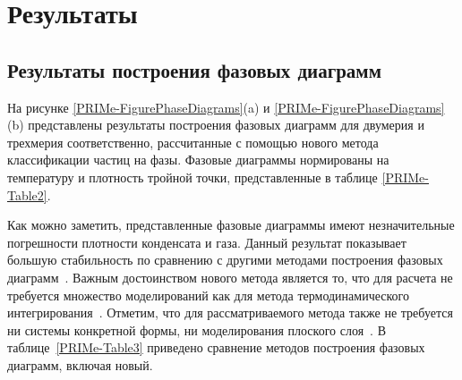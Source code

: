 \section{Результаты}
\label{PRIMe-SecResults}

\subsection{Результаты построения фазовых диаграмм}
\label{PRIMe-SubSecPhaseDiagramResults}

На рисунке \ref{PRIMe-FigurePhaseDiagrams}(a) и \ref{PRIMe-FigurePhaseDiagrams}(b) представлены результаты построения фазовых диаграмм для двумерия и трехмерия соответственно, рассчитанные с помощью нового метода классификации частиц на фазы.
Фазовые диаграммы нормированы на температуру и плотность тройной точки, представленные в таблице \ref{PRIMe-Table2}.

Как можно заметить, представленные фазовые диаграммы имеют незначительные погрешности плотности конденсата и газа.
Данный результат показывает большую стабильность по сравнению с другими методами построения фазовых диаграмм~\cite{10.1021/jp806127j, 10.1021/jp1117213}.
Важным достоинством нового метода является то, что для расчета не требуется множество моделирований как для метода термодинамического интегрирования~\cite{10.1080/00268976.2019.1699185}. Отметим, что для рассматриваемого метода также не требуется ни системы конкретной формы, ни моделирования плоского слоя~\cite{10.1021/jp806127j, 10.1021/jp1117213}.
В таблице~\ref{PRIMe-Table3} приведено сравнение методов построения фазовых диаграмм, включая новый.



\begin{table}[h!]
  \caption{Сравнение различных методов построения фазовых диаграмм.
    Под формой понимается применимость метода к кластерам произвольной формы, под 3D -- применимость в трехмерных системах, под скоростью -- величина затраченного времени в человеко-часах на одну точку фазовой диаграммы относительно других представленных методов, под точностью -- точность метода относительно других представленных методов.}
  \label{PRIMe-Table3}
\end{table}



